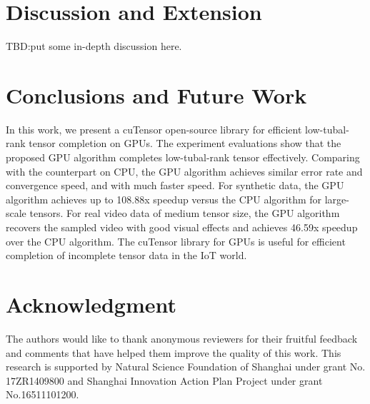 \documentclass[format=acmsmall, review=false, screen=true]{acmart}
\begin{document}
\section{Discussion and Extension}
TBD:put some in-depth discussion here.


\section{Conclusions and Future Work}
In this work, we present a cuTensor open-source library for efficient low-tubal-rank tensor completion on GPUs. The experiment evaluations show that the proposed GPU algorithm completes low-tubal-rank tensor effectively. Comparing with the counterpart on CPU, the GPU algorithm achieves similar error rate and convergence speed, and with much faster speed. For synthetic data, the GPU algorithm achieves up to 108.88x speedup versus the CPU algorithm for large-scale tensors. For real video data of medium tensor size, the GPU algorithm recovers the sampled video with good visual effects and achieves 46.59x speedup over the CPU algorithm. The cuTensor library for GPUs is useful for efficient completion of incomplete tensor data in the IoT world.

\section*{Acknowledgment}
The authors would like to thank anonymous reviewers for their fruitful feedback and comments that have helped them improve the quality of this work. This research is supported by Natural Science Foundation of Shanghai under grant No. 17ZR1409800 and Shanghai Innovation Action Plan Project under grant No.16511101200.





\end{document}

